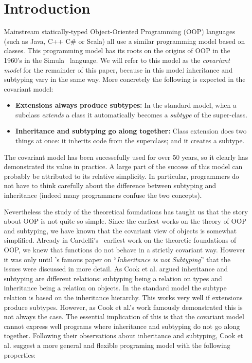 \section{Introduction}

Mainstream statically-typed Object-Oriented Programming (OOP) languages (such as Java,
C++ C\# or Scala) all use a similar programming model based on
classes. This programming model has its roots on the
origins of OOP in the 1960's in the Simula~\cite{dahl1967simula} language.
We will refer to this model as the \emph{covariant model} for the
remainder of this paper, because in this model inheritance and
subtyping vary in the same way. More concretely
the following is expected in the covariant model:

\begin{itemize}

\item {\bf Extensions always produce subtypes:} In the standard model, when a 
subclass \emph{extends} a class it automatically becomes a 
\emph{subtype} of the super-class. 

\item{\bf Inheritance and subtyping go along together:}
Class extension does two things at once: it inherits code from the
superclass; and it creates a subtype. 

\end{itemize}

The covariant model has been sucessefully used for over 50 years,
so it clearly has demonstrated its value in practice. 
A large part of the success of this model can probably be attributed 
to its relative simplicity. In particular, programmers do not have to think carefully 
about the difference between subtyping and inheritance (indeed many
programmers confuse the two concepts). 

Nevertheless the study of the theoretical foundations has
taught us that the story about OOP is not quite so simple. Since the
earliest works on the theory of OOP and subtyping, we have known that 
the covariant view of objects is somewhat simplified. Already in
Cardelli's~\cite{} earliest work on the theoretic foundations of OOP,
we knew that functions do not behave in a strictly covariant way. 
However it was only until \citet{cook1989inheritance}'s famous paper on
``\emph{Inheritance is not Subtyping}'' that the issues were discussed 
in more detail. As Cook et al. argued inheritance and
subtyping are different relations: subtyping being a relation on types 
and inheritance being a relation on objects. In the standard model 
the subtype relation is based on the inheritance hierarchy. This 
works very well if extensions produce 
subtypes. However, as Cook et al.'s work famously demonstrated 
this is not always the case. The essential implication of this is that
the covariant model cannot express well programs where inheritance 
and subtyping do not go along together. Following their observations about 
inheritance and subtyping, Cook et al. suggest a more general and 
flexible programing model with the following properties:

